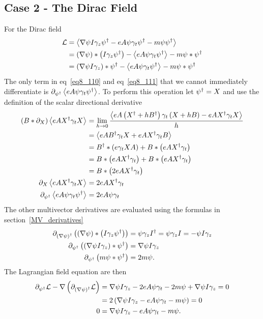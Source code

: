 \subsection{Case 2 - The Dirac Field}
For the Dirac field
\begin{align}
		\mathcal{L} &= \left < {\nabla\psi I\gamma_{z}\psi^{\dagger}-eA\psi\gamma_{t}\psi^{\dagger}-m\psi\psi^{\dagger}} \right >_{} \nonumber \\
		            &= \left ( {\nabla\psi} \right )*\left ( {I\gamma_{z}\psi^{\dagger}} \right )-\left < {eA\psi\gamma_{t}\psi^{\dagger}} \right >_{} - m\psi*\psi^{\dagger} 
		               \label{eq8_110}\\
		            &= \left ( {\nabla\psi I\gamma_{z}} \right )*\psi^{\dagger}-\left < {eA\psi\gamma_{t}\psi^{\dagger}} \right >_{} - m\psi*\psi^{\dagger} \label{eq8_111}
\end{align}
The only term in eq~\ref{eq8_110} and eq~\ref{eq8_111} that we cannot immediately differentiate is 
$\partial_{\psi^{\dagger}}\left < {eA\psi\gamma_{t}\psi^{\dagger}} \right >_{}$. To perform this operation let $\psi^{\dagger} = X$ and use the definition of
the scalar directional derivative
\begin{align}
	\left ( {B*\partial_{X}} \right )\left < {eAX^{\dagger}\gamma_{t}X} \right >_{} &= 
		\lim_{h\rightarrow0}\displaystyle\frac{\left < {eA\left ( {X^{\dagger}+hB^{\dagger}} \right )\gamma_{t}\left ( {X+hB} \right )-eAX^{\dagger}\gamma_{t}X} \right >_{}}{h} \nonumber \\
		&= \left < {eAB^{\dagger}\gamma_{t}X+eAX^{\dagger}\gamma_{t}B} \right >_{} \nonumber \\
		&= B^{\dagger}*\left ( {e\gamma_{t}XA} \right )+B*\left ( {eAX^{\dagger}\gamma_{t}} \right ) \nonumber \\
		&= B*\left ( {eAX^{\dagger}\gamma_{t}} \right )+B*\left ( {eAX^{\dagger}\gamma_{t}} \right ) \nonumber \\
		&= B*\left ( {2eAX^{\dagger}\gamma_{t}} \right ) \\
	 \partial_{X}\left < {eAX^{\dagger}\gamma_{t}X} \right >_{} &= 2eAX^{\dagger}\gamma_{t} \\
	 \partial_{\psi^{\dagger}}\left < {eA\psi\gamma_{t}\psi^{\dagger}} \right >_{} &= 2eA\psi\gamma_{t}
\end{align}
The other multivector derivatives are evaluated using the formulas in section~\ref{MV_derivatives}
\begin{align}
	\partial_{\left ( {\nabla \psi} \right )^{\dagger}} \left ( {\left ( {\nabla\psi} \right )*\left ( {I\gamma_{z}\psi^{\dagger}} \right )} \right ) &=  \psi\gamma_{z}I^{\dagger} 
		= \psi\gamma_{z}I = -\psi I\gamma_{z} \\
	\partial_{\psi^{\dagger}}\left ( {\left ( {\nabla\psi I\gamma_{z}} \right )*\psi^{\dagger}} \right ) &= \nabla\psi I\gamma_{z} \\
	\partial_{\psi^{\dagger}}\left ( {m\psi*\psi^{\dagger}} \right ) &= 2m\psi.
\end{align}
The Lagrangian field equation are then
\begin{align}
	\partial_{\psi^{\dagger}}\mathcal{L}-\nabla\left ( {\partial_{\left ( {\nabla \psi} \right )^{\dagger}}\mathcal{L}} \right ) &= \nabla\psi I\gamma_{z}
		-2eA\psi\gamma_{t}-2m\psi+\nabla\psi I\gamma_{z} = 0 \nonumber \\
		&= 2\left ( {\nabla\psi I\gamma_{z}-eA\psi\gamma_{t}-m\psi} \right ) = 0 \nonumber \\
		0 &= \nabla\psi I\gamma_{z}-eA\psi\gamma_{t}-m\psi.
\end{align}

